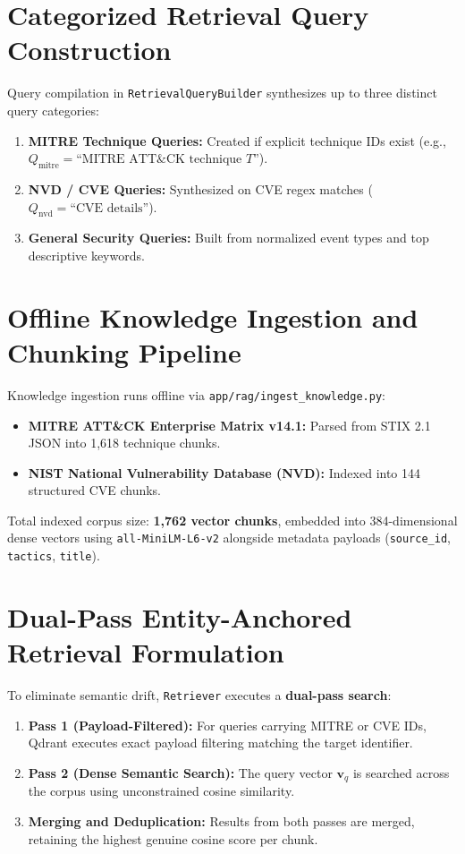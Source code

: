 \section{Categorized Retrieval Query Construction}
\label{sec:impl_query_builder}
Query compilation in \texttt{RetrievalQueryBuilder} synthesizes up to three distinct query categories:
\begin{enumerate}[itemsep=1pt,topsep=2pt]
    \item \textbf{MITRE Technique Queries:} Created if explicit technique IDs exist (e.g., $Q_{\text{mitre}} = \text{``MITRE ATT\&CK technique } T\text{''}$).
    \item \textbf{NVD / CVE Queries:} Synthesized on CVE regex matches ($Q_{\text{nvd}} = \text{``CVE details''}$).
    \item \textbf{General Security Queries:} Built from normalized event types and top descriptive keywords.
\end{enumerate}

\section{Offline Knowledge Ingestion and Chunking Pipeline}
\label{sec:impl_chunking}
Knowledge ingestion runs offline via \texttt{app/rag/ingest\_knowledge.py}:
\begin{itemize}[itemsep=1pt,topsep=2pt]
    \item \textbf{MITRE ATT\&CK Enterprise Matrix v14.1:} Parsed from STIX 2.1 JSON into 1,618 technique chunks.
    \item \textbf{NIST National Vulnerability Database (NVD):} Indexed into 144 structured CVE chunks.
\end{itemize}
Total indexed corpus size: \textbf{1,762 vector chunks}, embedded into 384-dimensional dense vectors using \texttt{all-MiniLM-\allowbreak L6-v2} alongside metadata payloads (\texttt{source\_id}, \texttt{tactics}, \texttt{title}).

\section{Dual-Pass Entity-Anchored Retrieval Formulation}
\label{sec:impl_retriever}
To eliminate semantic drift, \texttt{Retriever} executes a \textbf{dual-pass search}:
\begin{enumerate}[itemsep=1pt,topsep=2pt]
    \item \textbf{Pass 1 (Payload-Filtered):} For queries carrying MITRE or CVE IDs, Qdrant executes exact payload filtering matching the target identifier.
    \item \textbf{Pass 2 (Dense Semantic Search):} The query vector $\mathbf{v}_q$ is searched across the corpus using unconstrained cosine similarity.
    \item \textbf{Merging and Deduplication:} Results from both passes are merged, retaining the highest genuine cosine score per chunk.
\end{enumerate}

